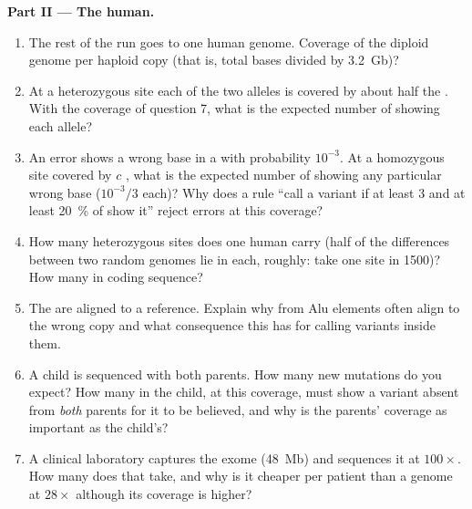 \begin{problem}
\medskip
\noindent\textbf{Part II --- The human.}
\begin{enumerate}[resume]
  \item The rest of the run goes to one human genome. Coverage of the
        diploid genome per haploid copy (that is, total bases divided
        by \qty{3.2}{Gb})?
  \item At a heterozygous site each of the two alleles is covered by
        about half the . With the coverage of question 7, what is
        the expected number of  showing each allele?
  \item An error shows a wrong base in a  with probability
        $10^{-3}$. At a homozygous site covered by $c$ , what is
        the expected number of  showing any particular wrong base
        ($10^{-3}/3$ each)? Why does a rule ``call a variant if at
        least $3$  and at least \qty{20}{\%} of  show it''
        reject errors at this coverage?
  \item How many heterozygous sites does one human carry (half of the
        differences between two random genomes lie in each, roughly:
        take one site in \num{1500})? How many in coding sequence?
  \item The  are aligned to a reference. Explain why  from
        Alu elements often align to the wrong copy and what
        consequence this has for calling variants inside them.
  \item A child is sequenced with both parents. How many new mutations
        do you expect? How many  in the child, at this coverage,
        must show a variant absent from \emph{both} parents for it to
        be believed, and why is the parents' coverage as important as
        the child's?
  \item A clinical laboratory captures the exome (\qty{48}{Mb}) and
        sequences it at $100\times$. How many  does that take, and
        why is it cheaper per patient than a genome at $28\times$
        although its coverage is higher?
\end{enumerate}


\end{problem}
